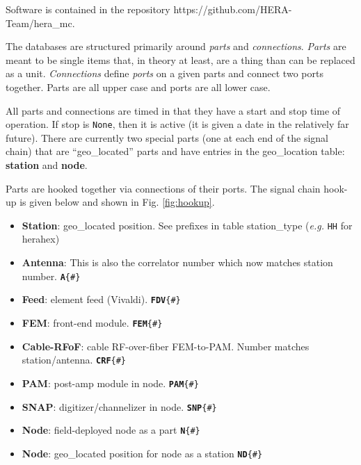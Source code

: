 \documentclass{article}[10pt]
\begin{document}
Software is contained in the repository https://github.com/HERA-Team/hera\_mc.

The databases are structured primarily around {\em parts} and {\em connections}.  {\em Parts} are meant to be single items that, in theory at least, are a thing than can be replaced as a unit.  
{\em Connections} define {\em ports} on a given parts and connect two ports together.  Parts are all upper case and ports are all lower case.

All parts and connections are timed in that they have a start and stop time of operation.  If stop is {\tt None}, then it is active (it is given a date in the relatively far future).  There are currently two special parts (one at each end of the signal chain) that are ``geo\_located'' parts and have entries in the geo\_location table: {\bf station} and {\bf node}.

Parts are hooked together via connections of their ports.   The signal chain hook-up is given below and shown in Fig. \ref{fig:hookup}.
\begin{itemize}\setlength\itemsep{-.3em}
	\item {\bf Station}: geo\_located position.  See prefixes in table station\_type ({\em e.g.} {\tt HH} for herahex)
	\item {\bf Antenna}:  This is also the correlator number which now matches station number.  {\tt{\bf A}\{\#\}}
	\item {\bf Feed}:  element feed (Vivaldi).  {\tt {\bf FDV}\{\#\}}
	\item {\bf FEM}:  front-end module. {\tt {\bf FEM}\{\#\}}
	\item {\bf Cable-RFoF}:  cable RF-over-fiber FEM-to-PAM.  Number matches station/antenna. {\tt {\bf CRF}\{\#\}}
	\item {\bf PAM}:  post-amp module in node. {\tt {\bf PAM}\{\#\}}
	\item {\bf SNAP}:  digitizer/channelizer in node. {\tt {\bf SNP}\{\#\}}
	\item {\bf Node}: field-deployed node as a part {\tt {\bf N}\{\#\}}
	\item {\bf Node}:  geo\_located position for node as a station {\tt {\bf ND}\{\#\}}
\end{itemize}
\end{document}
